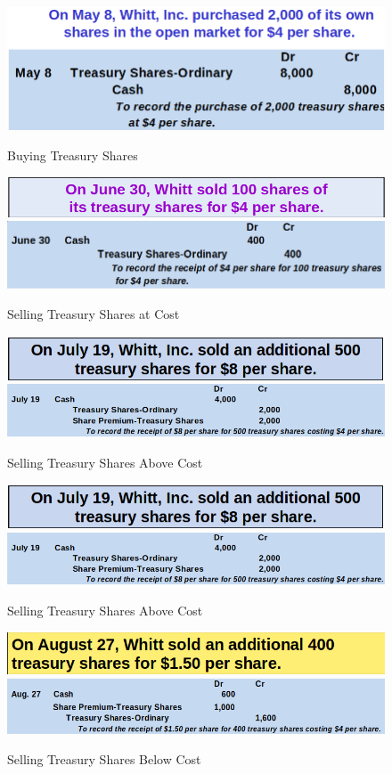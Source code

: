 \documentclass[../main.tex]{subfiles}
\begin{document}
	\begin{figure}[ht]
		\centering
		\includegraphics[width=1\columnwidth]{images/c9/purchase_treasury.png}
		\caption{Buying Treasury Shares}
		\includegraphics[width=1\columnwidth]{images/c9/selling_treasury.png}
		\includegraphics[width=1\columnwidth]{images/c9/selling_treasury_2.png}
		\caption{Selling Treasury Shares at Cost}
		\includegraphics[width=1\columnwidth]{images/c9/sell_treasury_above.png}
		\includegraphics[width=1\columnwidth]{images/c9/sell_treasury_above2.png}
		\caption{Selling Treasury Shares Above Cost}
		\includegraphics[width=1\columnwidth]{images/c9/sell_treasury_above.png}
		\includegraphics[width=1\columnwidth]{images/c9/sell_treasury_above2.png}
		\caption{Selling Treasury Shares Above Cost}
		\includegraphics[width=1\columnwidth]{images/c9/treasury_below.png}
		\includegraphics[width=1\columnwidth]{images/c9/treasury_below2.png}
		\caption{Selling Treasury Shares Below Cost}
	\end{figure}
\end{document}
